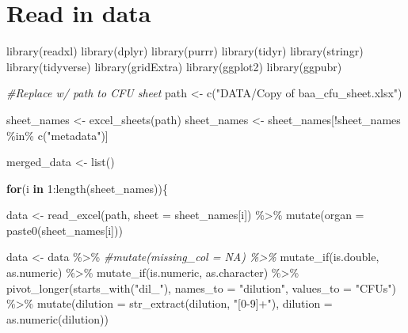 \documentclass[
]{book}
\newenvironment{Shaded}{\begin{snugshade}}{\end{snugshade}}
\newcommand{\AttributeTok}[1]{\textcolor[rgb]{0.77,0.63,0.00}{#1}}
\newcommand{\CommentTok}[1]{\textcolor[rgb]{0.56,0.35,0.01}{\textit{#1}}}
\newcommand{\ControlFlowTok}[1]{\textcolor[rgb]{0.13,0.29,0.53}{\textbf{#1}}}
\newcommand{\DecValTok}[1]{\textcolor[rgb]{0.00,0.00,0.81}{#1}}
\newcommand{\FunctionTok}[1]{\textcolor[rgb]{0.00,0.00,0.00}{#1}}
\newcommand{\NormalTok}[1]{#1}
\newcommand{\OtherTok}[1]{\textcolor[rgb]{0.56,0.35,0.01}{#1}}
\newcommand{\SpecialCharTok}[1]{\textcolor[rgb]{0.00,0.00,0.00}{#1}}
\newcommand{\StringTok}[1]{\textcolor[rgb]{0.31,0.60,0.02}{#1}}
\begin{document}
\hypertarget{read-in-data-1}{%
\section{Read in data}\label{read-in-data-1}}

\begin{Shaded}
\begin{Highlighting}[]
\FunctionTok{library}\NormalTok{(readxl)}
\FunctionTok{library}\NormalTok{(dplyr)}
\FunctionTok{library}\NormalTok{(purrr)}
\FunctionTok{library}\NormalTok{(tidyr)}
\FunctionTok{library}\NormalTok{(stringr)}
\FunctionTok{library}\NormalTok{(tidyverse)}
\FunctionTok{library}\NormalTok{(gridExtra)}
\FunctionTok{library}\NormalTok{(ggplot2)}
\FunctionTok{library}\NormalTok{(ggpubr)}

\CommentTok{\#Replace w/ path to CFU sheet}
\NormalTok{path }\OtherTok{\textless{}{-}} \FunctionTok{c}\NormalTok{(}\StringTok{"DATA/Copy of baa\_cfu\_sheet.xlsx"}\NormalTok{)}

\NormalTok{sheet\_names }\OtherTok{\textless{}{-}} \FunctionTok{excel\_sheets}\NormalTok{(path)}
\NormalTok{sheet\_names }\OtherTok{\textless{}{-}}\NormalTok{ sheet\_names[}\SpecialCharTok{!}\NormalTok{sheet\_names }\SpecialCharTok{\%in\%} \FunctionTok{c}\NormalTok{(}\StringTok{"metadata"}\NormalTok{)]}

\NormalTok{merged\_data }\OtherTok{\textless{}{-}} \FunctionTok{list}\NormalTok{()}

\ControlFlowTok{for}\NormalTok{(i }\ControlFlowTok{in} \DecValTok{1}\SpecialCharTok{:}\FunctionTok{length}\NormalTok{(sheet\_names))\{}
  
\NormalTok{  data }\OtherTok{\textless{}{-}} \FunctionTok{read\_excel}\NormalTok{(path, }\AttributeTok{sheet =}\NormalTok{ sheet\_names[i]) }\SpecialCharTok{\%\textgreater{}\%} 
    \FunctionTok{mutate}\NormalTok{(}\AttributeTok{organ =} \FunctionTok{paste0}\NormalTok{(sheet\_names[i]))}
  
\NormalTok{  data }\OtherTok{\textless{}{-}}\NormalTok{ data }\SpecialCharTok{\%\textgreater{}\%} 
    \CommentTok{\#mutate(missing\_col = NA) \%\textgreater{}\% }
    \FunctionTok{mutate\_if}\NormalTok{(is.double, as.numeric) }\SpecialCharTok{\%\textgreater{}\%} 
    \FunctionTok{mutate\_if}\NormalTok{(is.numeric, as.character) }\SpecialCharTok{\%\textgreater{}\%} 
    \FunctionTok{pivot\_longer}\NormalTok{(}\FunctionTok{starts\_with}\NormalTok{(}\StringTok{"dil\_"}\NormalTok{), }\AttributeTok{names\_to =} \StringTok{"dilution"}\NormalTok{,}
                 \AttributeTok{values\_to =} \StringTok{"CFUs"}\NormalTok{) }\SpecialCharTok{\%\textgreater{}\%} 
    \FunctionTok{mutate}\NormalTok{(}\AttributeTok{dilution =} \FunctionTok{str\_extract}\NormalTok{(dilution, }\StringTok{"[0{-}9]+"}\NormalTok{),}
           \AttributeTok{dilution =} \FunctionTok{as.numeric}\NormalTok{(dilution))}
    

\end{Highlighting}
\end{Shaded}
\end{document}
